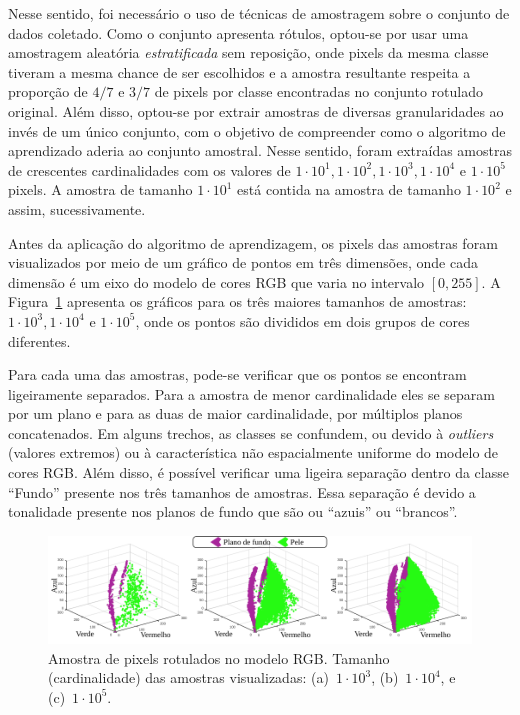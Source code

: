 Nesse sentido, foi necessário o uso de técnicas de amostragem sobre o conjunto de dados coletado.
Como o conjunto apresenta rótulos, optou-se por usar uma amostragem aleatória \textit{estratificada} sem reposição, onde pixels da mesma classe tiveram a mesma chance de ser escolhidos e a amostra resultante respeita a proporção de $4/7$ e $3/7$ de pixels por classe encontradas no conjunto rotulado original.
Além disso, optou-se por extrair amostras de diversas granularidades ao invés de um único conjunto, com o objetivo de compreender como o algoritmo de aprendizado aderia ao conjunto amostral.
Nesse sentido, foram extraídas amostras de crescentes cardinalidades com os valores de $1 \cdot 10^1, 1 \cdot 10^2, 1 \cdot 10^3, 1 \cdot 10^4$ e $1 \cdot 10^5$ pixels.
A amostra de tamanho $1 \cdot 10^1$ está contida na amostra de tamanho $1 \cdot 10^2$ e assim, sucessivamente.

Antes da aplicação do algoritmo de aprendizagem, os pixels das amostras foram visualizados por meio de um gráfico de pontos em três dimensões, onde cada dimensão é um eixo do modelo de cores RGB que varia no intervalo $[0, 255]$.
A Figura~\ref{fig:plot} apresenta os gráficos para os três maiores tamanhos de amostras: $1 \cdot 10^3, 1 \cdot 10^4$ e $1 \cdot 10^5$, onde os pontos são divididos em dois grupos de cores diferentes.

Para cada uma das amostras, pode-se verificar que os pontos se encontram ligeiramente separados.
Para a amostra de menor cardinalidade eles se separam por um plano e para as duas de maior cardinalidade, por múltiplos planos concatenados.
Em alguns trechos, as classes se confundem, ou devido à \textit{outliers} (valores extremos) ou à característica não espacialmente uniforme do modelo de cores RGB.
Além disso, é possível verificar uma ligeira separação dentro da classe ``Fundo'' presente nos três tamanhos de amostras.
Essa separação é devido a tonalidade presente nos planos de fundo que são ou ``azuis'' ou ``brancos''.

\begin{figure}[!htb]
\centering
\includegraphics[scale=.92]{_fig/plots.pdf}
\caption[Amostra de pixels rotulados no modelo RGB]{Amostra de pixels rotulados no modelo RGB.
Tamanho (cardinalidade) das amostras visualizadas:
(a)~$1 \cdot 10^3$,
(b)~$1 \cdot 10^4$, e
(c)~$1 \cdot 10^5$.}
\label{fig:plot}
\end{figure}

